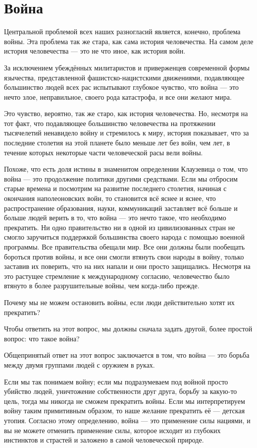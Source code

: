 \chapter{Война}

Центральной проблемой всех наших разногласий является, конечно, проблема войны. Эта проблема так же стара, как сама история человечества. На самом деле история человечества — это не что иное, как история войн.
 
За исключением убеждённых милитаристов и приверженцев современной формы язычества, представленной фашистско-нацистскими движениями, подавляющее большинство людей всех рас испытывают глубокое чувство, что война — это нечто злое, неправильное, своего рода катастрофа, и все они желают мира.

Это чувство, вероятно, так же старо, как история человечества. Но, несмотря на тот факт, что подавляющее большинство человечества на протяжении тысячелетий ненавидело войну и стремилось к миру, история показывает, что за последние столетия на этой планете было меньше лет без войн, чем лет, в течение которых некоторые части человеческой расы вели войны.
 
Похоже, что есть доля истины в знаменитом определении Клаузевица о том, что война — это продолжение политики другими средствами. Если мы отбросим старые времена и посмотрим на развитие последнего столетия, начиная с окончания наполеоновских войн, то становится всё яснее и яснее, что распространение образования, науки, коммуникаций заставляет всё больше и больше людей верить в то, что война — это нечто такое, что необходимо прекратить. Ни одно правительство ни в одной из цивилизованных стран не смогло заручиться поддержкой большинства своего народа с помощью военной программы. Все правительства обещали мир. Все они должны были пообещать бороться против войны, и все они смогли втянуть свои народы в войну, только заставив их поверить, что на них напали и они просто защищались. Несмотря на это растущее стремление к международному согласию, человечество было втянуто в более разрушительные войны, чем когда-либо прежде.
 
Почему мы не можем остановить войны, если люди действительно хотят их прекратить?
 
Чтобы ответить на этот вопрос, мы должны сначала задать другой, более простой вопрос: что такое война?
 
Общепринятый ответ на этот вопрос заключается в том, что война — это борьба между двумя группами людей с оружием в руках.
 
Если мы так понимаем войну; если мы подразумеваем под войной просто убийство людей, уничтожение собственности друг друга, борьбу за какую-то цель, тогда мы никогда не сможем прекратить войны. Если мы интерпретируем войну таким примитивным образом, то наше желание прекратить её — детская утопия. Согласно этому определению, война — это применение силы нациями, и вы не можете отменить применение силы, которое исходит из глубоких инстинктов и страстей и заложено в самой человеческой природе.
 
